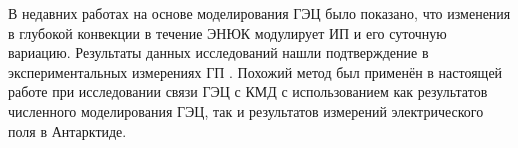 В недавних работах \cite{Slyunyaev_et_al_2021a,Slyunyaev_et_al_2021b} на основе моделирования ГЭЦ было показано, что изменения в глубокой конвекции в течение ЭНЮК модулирует ИП и его суточную вариацию. Результаты данных исследований нашли подтверждение в экспериментальных измерениях ГП \cite{Harrison_et_al_2011,Slyunyaev_et_al_2021c}. Похожий метод был применён в настоящей работе при исследовании связи ГЭЦ с КМД с использованием как результатов численного моделирования ГЭЦ, так и результатов измерений электрического поля в Антарктиде.
